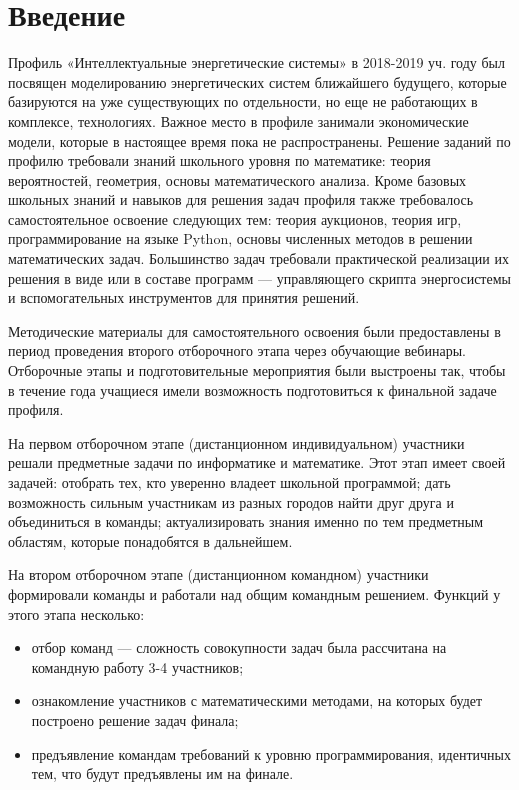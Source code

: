 

\chapter{Введение}

Профиль «Интеллектуальные энергетические системы» в 2018-2019 уч. году был посвящен моделированию энергетических систем ближайшего будущего, которые базируются на уже существующих по отдельности, но еще не работающих в комплексе, технологиях. Важное место в профиле занимали экономические модели, которые в настоящее время пока не распространены. Решение заданий по профилю требовали знаний школьного уровня по математике: теория вероятностей, геометрия, основы математического анализа. Кроме базовых школьных знаний и навыков для решения задач профиля также требовалось самостоятельное освоение следующих тем: теория аукционов, теория игр, программирование на языке Python, основы численных методов в решении математических задач. Большинство задач требовали практической реализации их решения в виде или в составе программ — управляющего скрипта энергосистемы и вспомогательных инструментов для принятия решений.

Методические материалы для самостоятельного освоения были предоставлены в период проведения второго отборочного этапа через обучающие вебинары. Отборочные этапы и подготовительные мероприятия были выстроены так, чтобы в течение года учащиеся имели возможность подготовиться к финальной задаче профиля.

На первом отборочном этапе (дистанционном индивидуальном) участники решали предметные задачи по информатике и математике. Этот этап имеет своей задачей: отобрать тех, кто уверенно владеет школьной программой; дать возможность сильным участникам из разных городов найти друг друга и объединиться в команды; актуализировать знания именно по тем предметным областям, которые понадобятся в дальнейшем.

На втором отборочном этапе (дистанционном командном) участники формировали команды и работали над общим командным решением. Функций у этого этапа несколько: 
\begin{itemize}
\item отбор команд — сложность совокупности задач была рассчитана на  командную работу 3-4 участников; 
\item ознакомление участников с математическими методами, на которых будет построено решение задач финала; 
\item предъявление командам требований к уровню программирования, идентичных тем, что будут предъявлены им на финале.
\end{itemize}

